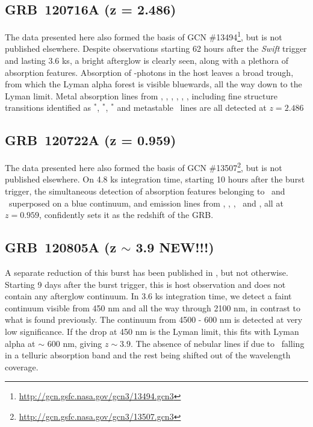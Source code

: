 \documentclass{aa}    %
\begin{document}
\subsection{GRB~120716A (z = 2.486)}
The data presented here also formed the basis of GCN \#13494\footnote{\url{http://gcn.gsfc.nasa.gov/gcn3/13494.gcn3}}, but is not
published elsewhere. Despite observations starting 62 hours after the
\textit{Swift} trigger and lasting 3.6 ks, a bright afterglow is clearly seen,
along with a plethora of absorption features. Absorption of \lya-photons in the
host leaves a broad trough, from which the Lyman alpha forest is visible
bluewards, all the way down to the Lyman limit. Metal absorption lines from
\cii, \SIii, \oi, \feii, \civ, \SIiv, including fine structure transitions
identified as \cii$^*$, \SIii$^*$, \feii$^*$ and metastable \NIii~lines are all
detected at $z = 2.486$


\subsection{GRB~120722A (z = 0.959)}
The data presented here also formed the basis of GCN \#13507\footnote{\url{http://gcn.gsfc.nasa.gov/gcn3/13507.gcn3}}, but is not
published elsewhere. On 4.8 ks integration time, starting 10 hours after the
burst trigger, the simultaneous detection of absorption features belonging to
\mgii~and \feii~superposed on a blue continuum, and emission lines from \oii,
\hg, \hb, \oiii~and \ha, all at $z = 0.959$, confidently sets it as the
redshift of the GRB.



\subsection{GRB~120805A (z $\sim$ 3.9 NEW!!!)}
A separate reduction of this burst has been published in \citet{Kruhler2015},
but not otherwise. Starting 9 days after the burst trigger, this is host
observation and does not contain any afterglow continuum. In 3.6 ks integration
time, we detect a faint continuum visible from 450 nm and all the way through
2100 nm, in contrast to what is found previously. The continuum from 4500 -
600 nm is detected at very low significance. If the drop at 450 nm is the
Lyman limit, this fits with Lyman alpha at $\sim$ 600 nm, giving $z \sim
3.9$. The absence of nebular lines if due to \oii~falling in a telluric
absorption band and the rest being shifted out of the wavelength coverage.
\end{document}
